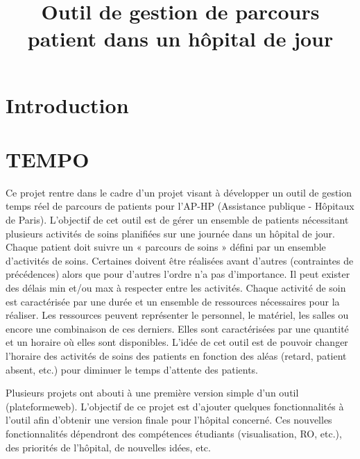 \documentclass{polytech/polytech}
\title{Outil de gestion de parcours patient dans un hôpital de jour}
\begin{document}
\chapter*{Introduction}

\chapter*{TEMPO}

Ce projet rentre dans le cadre d’un projet visant à développer un outil de gestion temps réel de parcours de patients pour l’AP-HP (Assistance publique - Hôpitaux de Paris).  L’objectif de cet outil est de gérer un ensemble de patients nécessitant plusieurs activités de soins planifiées sur une journée dans un hôpital de jour. Chaque patient doit suivre un « parcours de soins » défini par un ensemble d’activités de soins. Certaines doivent être réalisées avant d’autres (contraintes de précédences) alors que pour d’autres l’ordre n’a pas d’importance. Il peut exister des délais min et/ou max à respecter entre les activités. Chaque activité de soin est caractérisée par une durée et un ensemble de ressources nécessaires pour la réaliser. Les ressources peuvent représenter le personnel, le matériel, les salles ou encore une combinaison de ces derniers. Elles sont caractérisées par une quantité et un horaire où elles sont disponibles. L’idée de cet outil est de pouvoir changer l’horaire des activités de soins des patients en fonction des aléas (retard, patient absent, etc.) pour diminuer le temps d’attente des patients.

Plusieurs projets ont abouti à une première version simple d’un outil (plateformeweb). L’objectif de ce projet est d’ajouter quelques fonctionnalités à l’outil afin d’obtenir une version finale pour l’hôpital concerné. Ces nouvelles fonctionnalités dépendront des compétences étudiants (visualisation, RO, etc.), des priorités de l’hôpital, de nouvelles idées, etc.
\end{document}
